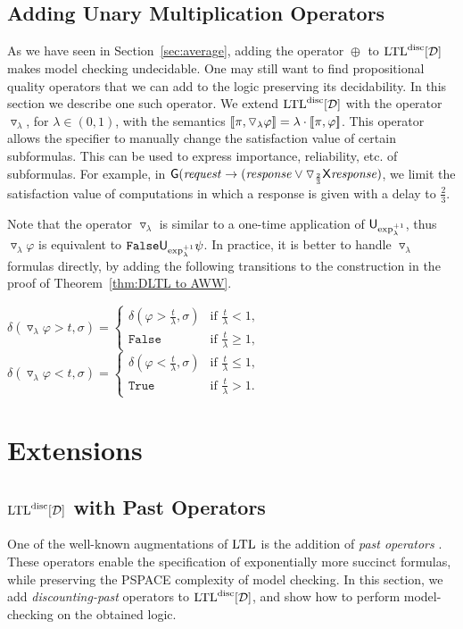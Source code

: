 \documentclass{llncs}
\newcommand{\True}{\mathtt{True}}
\newcommand{\False}{\mathtt{False}}
\newcommand{\LTL}{{\ensuremath{\rm LTL}}\xspace}
\newcommand{\Next}{\mathsf{X}}
\newcommand{\Alw}{\mathsf{G}}
\newcommand{\Until}{\mathsf{U}}
\newcommand{\D}{{\cal D}}
\newcommand{\Competence}{\triangledown}
\newcommand{\factorU}{\Competence}
\newcommand{\avg}[1]{\oplus_{#1}}
\renewcommand{\phi}{\varphi}
\newcommand{\DLTL}{\ensuremath{\LTL^{\text{disc}}[\D]}}
\begin{document}
\subsection{Adding Unary Multiplication Operators}
\label{subsec: adding unary}
As we have seen in Section~\ref{sec:average}, adding the operator $\avg{}$ to $\DLTL$ makes model checking undecidable. One may still want to find propositional quality operators that we can add to the logic preserving its decidability. In this section we describe one such operator. We extend $\DLTL$ with the operator $\factorU_\lambda$, for $\lambda\in (0,1)$, with the semantics $\sem{\pi,\factorU_\lambda \phi}=\lambda\cdot \sem{\pi,\phi}$. This operator allows the specifier to manually change the satisfaction value of certain subformulas. This can be used to express importance, reliability, etc. of subformulas. For example, in $\Alw({\it  request} \rightarrow ({\it response} \vee \factorU_{\frac{2}{3}}\Next {\it response})$, we limit the satisfaction value of computations in which a response is given with a delay to $\frac{2}{3}$.

Note that the operator $\factorU_\lambda$ is similar to a one-time application of
$\Until_{\dfl{\lambda}^{+1}}$, thus $\factorU_\lambda \phi$ is equivalent to $\False \Until_{\dfl{\lambda}^{+1}} \psi$. In practice, it is better to handle $\factorU_\lambda$ formulas directly, by adding the following transitions to the construction in the proof of Theorem~\ref{thm:DLTL to AWW}.

\hspace{-.6cm}$\delta(\factorU_\lambda \phi>t,\sigma)=\begin{cases}
\delta(\phi>\frac{t}{\lambda},\sigma) & \text{if } \frac{t}{\lambda}<1,\\
\False & \text{if } \frac{t}{\lambda}\ge 1,
\end{cases}$$\delta(\factorU_\lambda \phi<t,\sigma)=\begin{cases}
\delta(\phi<\frac{t}{\lambda},\sigma) & \text{if } \frac{t}{\lambda}\le 1,\\
\True & \text{if } \frac{t}{\lambda}> 1.
\end{cases}$

\vspace*{-3mm}
\section{Extensions}\label{sec:ext}

\subsection{$\DLTL$ with Past Operators}
\label{ext:past}
One of the well-known augmentations of $\LTL$ is the addition of {\em past operators\/} \cite{LPZ85}. These operators enable the specification of exponentially more succinct formulas, while preserving the PSPACE complexity of model checking.
In this section, we add {\em discounting-past} operators to $\DLTL$, and show how to perform model-checking on the obtained logic.
\end{document}
